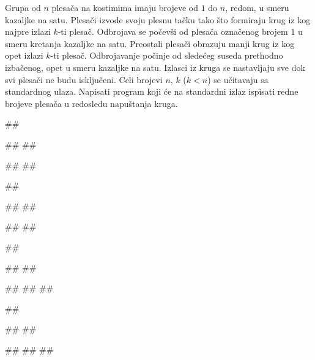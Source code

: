 \begin{Exercise}[label=612]
Grupa od $n$ plesača na kostimima imaju brojeve od $1$ do $n$, redom, u smeru kazaljke na satu.
Plesači izvode svoju plesnu tačku tako što formiraju krug iz kog najpre izlazi $k$-ti plesač.
Odbrojava se počevši od plesača označenog brojem $1$ u smeru kretanja kazaljke na satu. 
Preostali plesači obrazuju manji krug iz kog opet izlazi $k$-ti plesač. Odbrojavanje počinje od
sledećeg suseda prethodno izbačenog, opet u smeru kazaljke na satu. Izlasci iz kruga se nastavljaju
sve dok svi plesači ne budu isključeni. 
Celi brojevi $n$, $k$ ($k < n$) se učitavaju sa standardnog ulaza. 
Napisati program koji će na standardni izlaz ispisati redne brojeve plesača u redosledu napuštanja kruga. 

\noindent
\begin{minitest}
\begin{test}{1}
##

#\naslovUlaz#
##

#\naslovIzlaz# 
##
\end{test}
\end{minitest}
\begin{minitest}
\begin{test}{2}
##

#\naslovUlaz#
##

#\naslovIzlaz# 
## 
\end{test}
\end{minitest}
\begin{minitest}
\begin{test}{3}
##

#\naslovUlaz#
##

#\naslovIzlaz# 
##
##
\end{test}
\end{minitest}
\begin{minitest}
\begin{test}{4}
##

#\naslovUlaz#
##

#\naslovIzlaz# 
##
##
\end{test}
\end{minitest}
\end{Exercise}
\begin{Answer}[ref=612]
\end{Answer}

